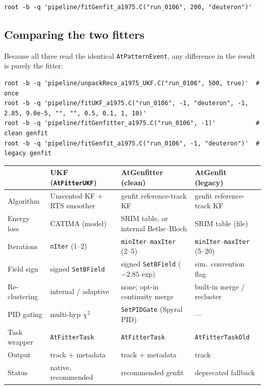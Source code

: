 \documentclass[11pt,a4paper]{article}
\newcommand{\code}[1]{\texttt{\small #1}}
\begin{document}
\begin{lstlisting}[style=bash]
root -b -q 'pipeline/fitGenfit_a1975.C("run_0106", 200, "deuteron")'
\end{lstlisting}

\subsection{Comparing the two fitters}

Because all three read the identical \code{AtPatternEvent}, any difference in the
result is purely the fitter:

\begin{lstlisting}[style=bash]
root -b -q 'pipeline/unpackReco_a1975_UKF.C("run_0106", 500, true)'  # once
root -b -q 'pipeline/fitUKF_a1975.C("run_0106", -1, "deuteron", -1, 2.85, 9.0e-5, "", "", 0.5, 0.1, 1, 10)'
root -b -q 'pipeline/fitGenfitter_a1975.C("run_0106", -1)'           # clean genfit
root -b -q 'pipeline/fitGenfit_a1975.C("run_0106", -1, "deuteron")'  # legacy genfit
\end{lstlisting}

\begin{center}
\footnotesize
\setlength{\tabcolsep}{4pt}
\renewcommand{\arraystretch}{1.15}
\begin{tabular}{@{}p{1.9cm}
  >{\raggedright\arraybackslash}p{3.5cm}
  >{\raggedright\arraybackslash}p{3.5cm}
  >{\raggedright\arraybackslash}p{3.5cm}@{}}
\toprule
 & \textbf{UKF} (\code{AtFitterUKF}) & \textbf{AtGenfitter} (clean) & \textbf{AtGenfit} (legacy) \\
\midrule
Algorithm     & Unscented KF + RTS smoother & genfit reference-track KF & genfit reference-track KF \\
Energy loss   & CATIMA (model)              & SRIM table, or internal Bethe--Bloch & SRIM table (file) \\
Iterations    & \code{nIter} (1--2)         & \code{minIter}--\code{maxIter} (2--5) & \code{minIter}--\code{maxIter} (5--20) \\
Field sign    & signed \code{SetBField}     & signed \code{SetBField} ($-2.85$ exp) & sim.\ convention flag \\
Re-clustering & internal / adaptive         & none; opt-in continuity merge & built-in merge / recluster \\
PID gating    & multi-hyp $\chi^2$          & \code{SetPIDGate} (Spyral PID) & --- \\
Task wrapper  & \code{AtFitterTask}         & \code{AtFitterTask}        & \code{AtFitterTaskOld} \\
Output        & track + metadata            & track + metadata           & track \\
Status        & native, recommended         & recommended genfit         & deprecated fallback \\
\bottomrule
\end{tabular}
\end{center}
\end{document}
